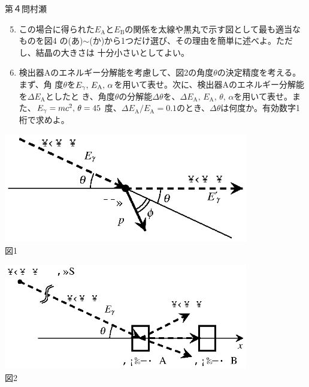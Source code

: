\begin{question}{第４問}{村瀬}
\begin{enumerate}
\setcounter{enumi}{4}
\item
  この場合に得られた$E_\mathrm{A}$と$E_\mathrm{B}$の関係を太線や黒丸で示す図として最も適当なものを図4
  の(あ)$\sim$(か)から1つだけ選び、その理由を簡単に述べよ。ただし、結晶の大きさは
  十分小さいとしてよい。
\item
  検出器Aのエネルギー分解能を考慮して、図2の角度$\theta$の決定精度を考える。まず、角
  度$\theta$を$E_\gamma,\, E_\mathrm{A},\, \alpha$を用いて表せ。次に、検出器Aのエネルギー分解能を$\Delta E_\mathrm{A}$としたと
  き、角度$\theta$の分解能$\Delta\theta$を、$\Delta E_\mathrm{A},\,E_\mathrm{A},\,\theta,\,\alpha$を用いて表せ。また、$E_\gamma=mc^2,\,\theta=45$
  度、$\Delta E_\mathrm{A}/E_\mathrm{A}=0.1$のとき、$\Delta\theta$は何度か。有効数字1桁で求めよ。
\end{enumerate}
\begin{center}
  \begin{minipage}{0.45\textwidth}
    \begin{center}
      \includegraphics[width=0.8\textwidth]{2007physQ4_1.eps}\\図1
    \end{center}
  \end{minipage}
  \begin{minipage}{0.45\textwidth}
    \begin{center}
      \includegraphics[width=0.8\textwidth]{2007physQ4_2.eps}\\図2
    \end{center}
  \end{minipage}
\end{center}
\begin{center}

\end{center}
\end{question}
